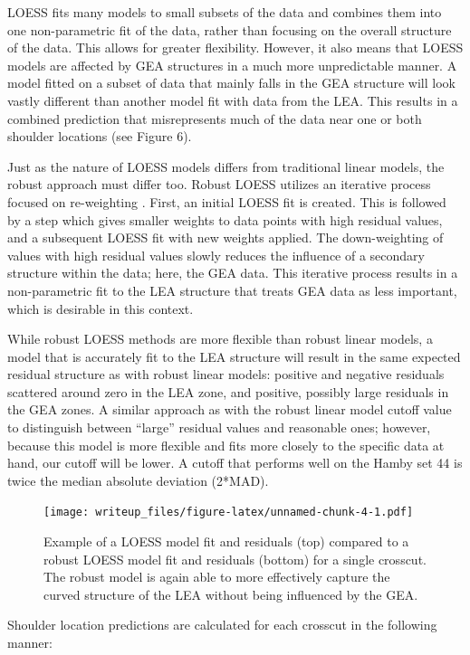 \documentclass[]{article}
\begin{document}
LOESS fits many models to small subsets of the data and combines them
into one non-parametric fit of the data, rather than focusing on the
overall structure of the data. This allows for greater flexibility.
However, it also means that LOESS models are affected by GEA structures
in a much more unpredictable manner. A model fitted on a subset of data
that mainly falls in the GEA structure will look vastly different than
another model fit with data from the LEA. This results in a combined
prediction that misrepresents much of the data near one or both shoulder
locations (see Figure 6).

Just as the nature of LOESS models differs from traditional linear
models, the robust approach must differ too. Robust LOESS utilizes an
iterative process focused on re-weighting \citep[see][]{Cleveland1}.
First, an initial LOESS fit is created. This is followed by a step which
gives smaller weights to data points with high residual values, and a
subsequent LOESS fit with new weights applied. The down-weighting of
values with high residual values slowly reduces the influence of a
secondary structure within the data; here, the GEA data. This iterative
process results in a non-parametric fit to the LEA structure that treats
GEA data as less important, which is desirable in this context.

While robust LOESS methods are more flexible than robust linear models,
a model that is accurately fit to the LEA structure will result in the
same expected residual structure as with robust linear models: positive
and negative residuals scattered around zero in the LEA zone, and
positive, possibly large residuals in the GEA zones. A similar approach
as with the robust linear model cutoff value to distinguish between
``large'' residual values and reasonable ones; however, because this
model is more flexible and fits more closely to the specific data at
hand, our cutoff will be lower. A cutoff that performs well on the Hamby
set 44 is twice the median absolute deviation (2*MAD).

\begin{figure}
\centering
\texttt{[image: writeup\_files/figure-latex/unnamed-chunk-4-1.pdf]}
\caption{Example of a LOESS model fit and residuals (top) compared to a
robust LOESS model fit and residuals (bottom) for a single crosscut. The
robust model is again able to more effectively capture the curved
structure of the LEA without being influenced by the GEA.}
\end{figure}

Shoulder location predictions are calculated for each crosscut in the
following manner:
\end{document}
